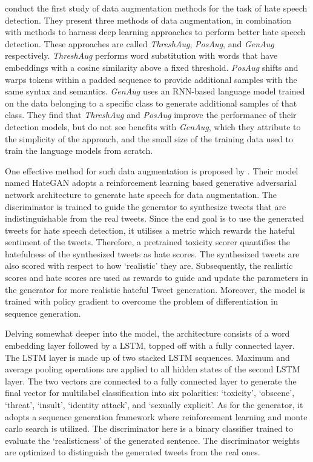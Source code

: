 \documentclass[11pt,a4paper]{article}
\begin{document}
\citet{aug2prev} conduct the first study of data augmentation methods for the task of hate speech detection. They present three methods of data augmentation, in combination with methods to harness deep learning approaches to perform better hate speech detection. These approaches are called \textit{ThreshAug}, \textit{PosAug}, and \textit{GenAug} respectively. \textit{ThreshAug} performs word substitution with words that have embeddings with a cosine similarity above a fixed threshold. \textit{PosAug} shifts and warps tokens within a padded sequence to provide additional samples with the same syntax and semantics. \textit{GenAug} uses an RNN-based language model trained on the data belonging to a specific class to generate additional samples of that class. They find that \textit{ThreshAug} and \textit{PosAug} improve the performance of their detection models, but do not see benefits with \textit{GenAug}, which they attribute to the simplicity of the approach, and the small size of the training data used to train the language models from scratch.

One effective method for such data augmentation is proposed by \citet{cao-lee-2020-hategan}. Their model named \textsf{HateGAN} adopts a reinforcement learning based generative adversarial network architecture to generate hate speech for data augmentation. The discriminator is trained to guide the generator to synthesize tweets that are indistinguishable from the real tweets. Since the end goal is to use the generated tweets for hate speech detection, it utilises a metric which rewards the hateful sentiment of the tweets. Therefore, a pretrained toxicity scorer quantifies the hatefulness of the synthesized tweets as hate scores. The synthesized tweets are also scored with respect to how `realistic' they are. Subsequently, the realistic scores and hate scores are used as rewards to guide and update the parameters in the generator for more realistic hateful Tweet generation. Moreover, the model is trained with policy gradient to overcome the problem of differentiation in sequence generation.

Delving somewhat deeper into the model, the architecture consists of a word embedding layer followed by a LSTM, topped off with a fully connected layer. The LSTM layer is made up of two stacked LSTM sequences. Maximum and average pooling operations are applied to all hidden states of the second LSTM layer. The two vectors are connected to a fully connected layer to generate the final vector for multilabel classification into six polarities: `toxicity', `obscene', `threat', `insult', `identity attack', and `sexually explicit'.
As for the generator, it adopts a sequence generation framework where reinforcement learning and monte carlo search is utilized. The discriminator here is a binary classifier trained to evaluate the `realisticness'
of the generated sentence. The discriminator weights are optimized to distinguish the generated tweets from the real ones.



\end{document}
